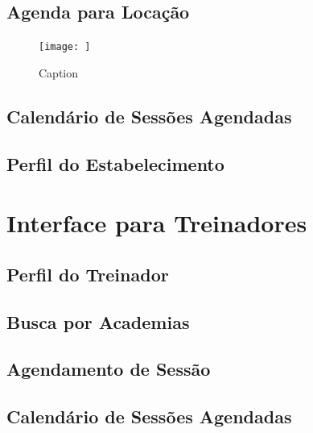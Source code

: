 \subsection{Agenda para Locação}

\begin{figure}
    \centering
    \texttt{[image: ]}
    \caption{Caption}
    \label{fig:my_label}
\end{figure}

\subsection{Calendário de Sessões Agendadas}

\subsection{Perfil do Estabelecimento}


\section{Interface para Treinadores}

\subsection{Perfil do Treinador}

\subsection{Busca por Academias}

\subsection{Agendamento de Sessão}

\subsection{Calendário de Sessões Agendadas}
